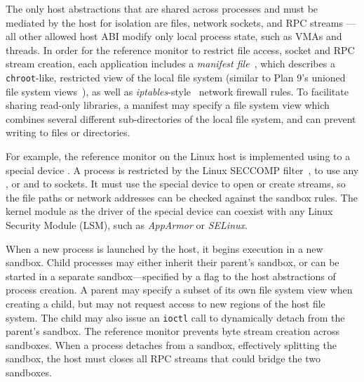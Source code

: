 The only host abstractions that are shared across processes and must be mediated by the host for isolation are files, network sockets, and RPC streams
--- all other allowed host ABI modify only local process state, such as VMAs and threads.
In order for the reference monitor to restrict file access, socket and RPC stream creation,
each application includes a \emph{manifest file}~\cite{hunt07rethink},
which describes a {\tt chroot}-like, restricted view of the local 
file system (similar to Plan 9's unioned file system views~\cite{pike90plan9}),
as well as \emph{iptables}-style~\cite{iptablesman} network firewall rules.
To facilitate sharing read-only libraries, a manifest may specify a file system view which combines several different sub-directories of the local file system, and can prevent writing to files or directories.


For example, the \graphene{} reference monitor on the Linux host is implemented using  to a special device .
A process is restricted by the Linux SECCOMP filter~\cite{seccomp}, to use any , or  and  to sockets.
It must use the \graphene{} special device to open or create streams, so the file paths or network addresses can be checked against the sandbox rules. The kernel module as the driver of the \graphene{} special device can coexist with any Linux Security Module (LSM), such as \emph{AppArmor} or \emph{SELinux}.


When a new process is launched by the host, it begins execution in a new sandbox.  
Child processes may either inherit their parent's sandbox, or can be started in a separate sandbox---specified by a flag to the host abstractions of process creation.
A parent may specify a subset of its own file system view 
when creating a child, but may not request access to new regions of the host file system. 
The child may also issue an {\tt ioctl} call to 
dynamically detach from the parent's sandbox. The reference monitor prevents byte stream creation across sandboxes.
When a process detaches from a sandbox, effectively splitting the sandbox, the host must closes all RPC streams that could bridge the two sandboxes.

